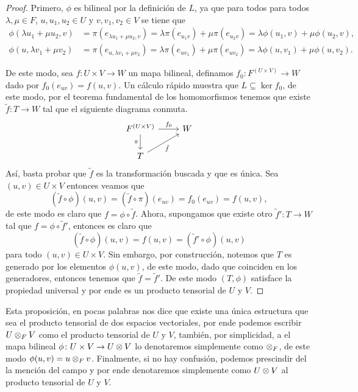 \begin{proof}
  Primero, $\phi$ es bilineal por la definición de $L$, ya que para todos para todos $\lambda, \mu\in F$, $u, u_1, u_2 \in U$ y $v, v_1, v_2 \in V$ se tiene que
  \begin{align*}
    \phi(\lambda u_1 + \mu u_2, v) &= \pi(e_{\lambda u_1 + \mu u_2, v}) =  \lambda \pi(e_{u_1 v}) + \mu \pi(e_{u_2 v} ) = \lambda \phi(u_1, v) + \mu \phi(u_2, v), \\
    \phi(u, \lambda v_1 + \mu v_2) &= \pi(e_{u, \lambda v_1 + \mu v_2}) =  \lambda \pi(e_{u v_1}) + \mu \pi(e_{u v_2} ) = \lambda \phi(u, v_1) + \mu \phi(u, v_2).
  \end{align*}

  De este modo, sea $f\colon U \times V \to W$ un mapa bilineal, definamos $f_0 \colon F^{(U \times V)} \to W$ dado por $f_0(e_{uv}) = f(u,v)$. Un cálculo rápido muestra que $L \subseteq \ker f_0$, de este modo, por el teorema fundamental de los homomorfismos tenemos que existe $\tilde f \colon T \to W$ tal que el siguiente diagrama conmuta.
  \[
    \begin{tikzcd}
      F^{(U \times V)} \arrow[d, "\pi"'] \arrow[r, "f_0"] & W \\
      T \arrow[ru, "\tilde f"']                           &  
      \end{tikzcd}
  \]
  Así, basta probar que $\tilde f$ es la transformación buscada y que es única. Sea $(u,v) \in U \times V$ entonces veamos que
  \[
    (\tilde f \circ \phi)(u,v) = (\tilde f \circ \pi)(e_{uv}) = f_0(e_{uv}) = f(u,v),
  \]
  de este modo es claro que $f = \phi \circ \tilde f$. Ahora, supongamos que existe otro $\tilde f' \colon T \to W$ tal que $f = \phi \circ \tilde f'$, entonces es claro que
  \[
    (\tilde f \circ \phi)(u,v) = f(u,v)  = (\tilde f' \circ \phi)(u,v)
  \]
  para todo $(u,v) \in U \times V$. Sin embargo, por construcción, notemos que $T$ es generado por los elementos $\phi(u,v)$, de este modo, dado que coinciden en los generadores, entonces tenemos que $\tilde f = \tilde f'$. De este modo $(T, \phi)$ satisface la propiedad universal y por ende es un producto tensorial de $U$ y $V$.
\end{proof}

Esta proposición, en pocas palabras nos dice que existe una única estructura que sea el producto tensorial de dos espacios vectoriales, por ende podemos escribir $U \otimes_F V$ como el producto tensorial de $U$ y $V$, también, por simplicidad, a el mapa bilineal $\phi\colon U \times V \to U \otimes V$ lo denotaremos simplemente como $\otimes_F$, de este modo
$\phi(u,v) = u \otimes_F v$. Finalmente, si no hay confusión, podemos prescindir del la mención del campo y por ende denotaremos simplemente como $U \otimes V$ al producto tensorial de $U$ y $V$.


